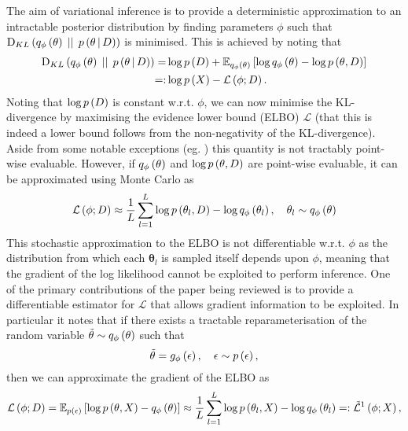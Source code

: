 \documentclass[../report.tex]{subfiles}
\begin{document}
The aim of variational inference is to provide a deterministic approximation to an intractable posterior distribution by finding parameters $\phi$ such that $\textrm{D}_{KL} \left( q_\phi \left( \mathbf{\theta}\right) \, \mid \mid \, p \left(\mathbf{\theta} \, \middle\vert \, D \right)\right)$ is minimised. This is achieved by noting that
\begin{align}
  \textrm{D}_{KL} \left( q_\phi \left( \mathbf{\theta}\right) \, \mid \mid \, p \left(\mathbf{\theta} \, \middle\vert \, D \right)\right) =& \log p \left( D\right) + \mathbb{E}_{q_\phi \left( \mathbf{\theta}\right)} \left[ \log q_\phi \left( \mathbf{\theta}\right)  - \log p \left( \mathbf{\theta} ,D\right) \right] \nonumber \\
  =:& \log p \left( X\right) - \mathcal{L} \left( \phi; D\right).
\end{align}
Noting that $\log p \left( D\right)$ is constant w.r.t. $\phi$, we can now minimise the KL-divergence by maximising the evidence lower bound (ELBO) $\mathcal{L}$ (that this is indeed a lower bound follows from the non-negativity of the KL-divergence). Aside from some notable exceptions (eg. \cite{titsias2009variational}) this quantity is not tractably point-wise evaluable. However, if $q_\phi \left( \mathbf{\theta}\right)$ and $\log p \left( \mathbf{\theta}, D\right)$ are point-wise evaluable, it can be approximated using Monte Carlo as
\begin{equation}
  \mathcal{L} \left( \phi; D\right) \approx \frac{1}{L} \sum_{l=1}^{L} \log p \left( \mathbf{\theta}_l ,D\right) - \log q_\phi \left( \mathbf{\theta}_l\right), \quad \mathbf{\theta}_l \sim q_\phi \left( \mathbf{\theta}\right)
\end{equation}
This stochastic approximation to the ELBO is not differentiable w.r.t. $\phi$ as the distribution from which each $\mathbf{\theta}_l$ is sampled itself depends upon $\phi$, meaning that the gradient of the log likelihood cannot be exploited to perform inference. One of the primary contributions of the paper being reviewed is to provide a differentiable estimator for $\mathcal{L}$ that allows gradient information to be exploited. In particular it notes that if there exists a tractable reparameterisation of the random variable $\tilde{\mathbf{\theta}} \sim q_\phi \left( \mathbf{\theta}\right)$ such that
\begin{equation}
  \tilde{\mathbf{\theta}} = g_\phi \left( \epsilon\right), \quad \epsilon \sim p \left( \epsilon\right),
\end{equation}
then we can approximate the gradient of the ELBO as
\begin{equation}
  \mathcal{L} \left( \phi; D\right) = \mathbb{E}_{p \left( \epsilon\right)} \left[ \log p \left( \mathbf{\theta} ,X\right) - q_\phi \left( \mathbf{\theta}\right) \right] \approx \frac{1}{L} \sum_{l=1}^{L} \log p \left( \mathbf{\theta}_l ,X\right) - \log q_\phi \left( \mathbf{\theta}_l\right) =: \tilde{\mathcal{L}}^1 \left( \phi; X\right),
\end{equation}
\end{document}
